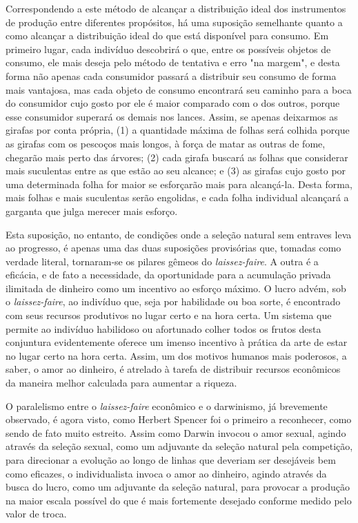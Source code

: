 \documentclass[12pt]{article}
\begin{document}
Correspondendo a este método de alcançar a distribuição ideal dos instrumentos de produção entre diferentes propósitos, há uma suposição semelhante quanto a como alcançar a distribuição ideal do que está disponível para consumo. Em primeiro lugar, cada indivíduo descobrirá o que, entre os possíveis objetos de consumo, ele mais deseja pelo método de tentativa e erro "na margem", e desta forma não apenas cada consumidor passará a distribuir seu consumo de forma mais vantajosa, mas cada objeto de consumo encontrará seu caminho para a boca do consumidor cujo gosto por ele é maior comparado com o dos outros, porque esse consumidor superará os demais nos lances. Assim, se apenas deixarmos as girafas por conta própria, (1) a quantidade máxima de folhas será colhida porque as girafas com os pescoços mais longos, à força de matar as outras de fome, chegarão mais perto das árvores; (2) cada girafa buscará as folhas que considerar mais suculentas entre as que estão ao seu alcance; e (3) as girafas cujo gosto por uma determinada folha for maior se esforçarão mais para alcançá-la. Desta forma, mais folhas e mais suculentas serão engolidas, e cada folha individual alcançará a garganta que julga merecer mais esforço.

Esta suposição, no entanto, de condições onde a seleção natural sem entraves leva ao progresso, é apenas uma das duas suposições provisórias que, tomadas como verdade literal, tornaram-se os pilares gêmeos do \textit{laissez-faire}. A outra é a eficácia, e de fato a necessidade, da oportunidade para a acumulação privada ilimitada de dinheiro como um incentivo ao esforço máximo. O lucro advém, sob o \textit{laissez-faire}, ao indivíduo que, seja por habilidade ou boa sorte, é encontrado com seus recursos produtivos no lugar certo e na hora certa. Um sistema que permite ao indivíduo habilidoso ou afortunado colher todos os frutos desta conjuntura evidentemente oferece um imenso incentivo à prática da arte de estar no lugar certo na hora certa. Assim, um dos motivos humanos mais poderosos, a saber, o amor ao dinheiro, é atrelado à tarefa de distribuir recursos econômicos da maneira melhor calculada para aumentar a riqueza.

O paralelismo entre o \textit{laissez-faire} econômico e o darwinismo, já brevemente observado, é agora visto, como Herbert Spencer foi o primeiro a reconhecer, como sendo de fato muito estreito. Assim como Darwin invocou o amor sexual, agindo através da seleção sexual, como um adjuvante da seleção natural pela competição, para direcionar a evolução ao longo de linhas que deveriam ser desejáveis bem como eficazes, o individualista invoca o amor ao dinheiro, agindo através da busca do lucro, como um adjuvante da seleção natural, para provocar a produção na maior escala possível do que é mais fortemente desejado conforme medido pelo valor de troca.
\end{document}
